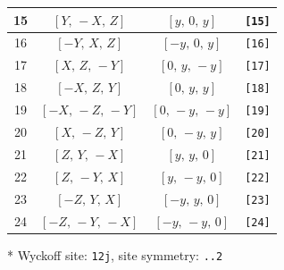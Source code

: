 \documentclass[fleqn,8pt]{jsarticle}
\begin{document}
\begin{longtable}{cccc}
15 & $\left[ Y,\, - X,\, Z \right]$ & $\left[ y,\, 0,\, y \right]$ & {\tt [15]} \\ \hline
16 & $\left[ - Y,\, X,\, Z \right]$ & $\left[ - y,\, 0,\, y \right]$ & {\tt [16]} \\ \hline
17 & $\left[ X,\, Z,\, - Y \right]$ & $\left[ 0,\, y,\, - y \right]$ & {\tt [17]} \\ \hline
18 & $\left[ - X,\, Z,\, Y \right]$ & $\left[ 0,\, y,\, y \right]$ & {\tt [18]} \\ \hline
19 & $\left[ - X,\, - Z,\, - Y \right]$ & $\left[ 0,\, - y,\, - y \right]$ & {\tt [19]} \\ \hline
20 & $\left[ X,\, - Z,\, Y \right]$ & $\left[ 0,\, - y,\, y \right]$ & {\tt [20]} \\ \hline
21 & $\left[ Z,\, Y,\, - X \right]$ & $\left[ y,\, y,\, 0 \right]$ & {\tt [21]} \\ \hline
22 & $\left[ Z,\, - Y,\, X \right]$ & $\left[ y,\, - y,\, 0 \right]$ & {\tt [22]} \\ \hline
23 & $\left[ - Z,\, Y,\, X \right]$ & $\left[ - y,\, y,\, 0 \right]$ & {\tt [23]} \\ \hline
24 & $\left[ - Z,\, - Y,\, - X \right]$ & $\left[ - y,\, - y,\, 0 \right]$ & {\tt [24]} \\
\end{longtable}
* Wyckoff site: {\tt 12j}, site symmetry: {\tt ..2}
\renewcommand{\arraystretch}{1.2}
\end{document}
